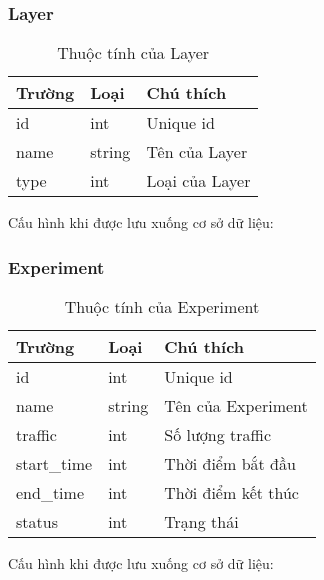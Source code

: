 \subsubsection{Layer}

\begin{table}[H]
	\centering
	\begin{tabular}{|l|l|l|}
		\hline
		Trường & Loại   & Chú thích      \\ \hline
		id     & int    & Unique id      \\ \hline
		name   & string & Tên của Layer  \\ \hline
		type   & int    & Loại của Layer \\ \hline
	\end{tabular}
	\caption{Thuộc tính của Layer}
\end{table}

Cấu hình khi được lưu xuống cơ sở dữ liệu:

\begin{itemize}
\end{itemize}

\subsubsection{Experiment}

\begin{table}[H]
	\centering
	\begin{tabular}{|l|l|l|}
		\hline
		Trường      & Loại   & Chú thích          \\ \hline
		id          & int    & Unique id          \\ \hline
		name        & string & Tên của Experiment \\ \hline
		traffic     & int    & Số lượng traffic   \\ \hline
		start\_time & int    & Thời điểm bắt đầu  \\ \hline
		end\_time   & int    & Thời điểm kết thúc \\ \hline
		status      & int    & Trạng thái         \\ \hline
	\end{tabular}
	\caption{Thuộc tính của Experiment}
\end{table}

Cấu hình khi được lưu xuống cơ sở dữ liệu:

\begin{itemize}
\end{itemize}

